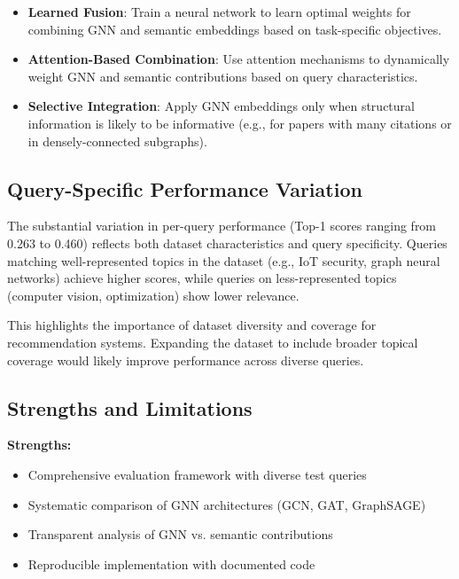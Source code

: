 \documentclass[pdflatex,sn-mathphys-num]{sn-jnl}
\theoremstyle{thmstyleone}%
\theoremstyle{thmstyletwo}%
\theoremstyle{thmstylethree}%
\begin{document}
\begin{itemize}
    \item \textbf{Learned Fusion}: Train a neural network to learn optimal weights for combining GNN and semantic embeddings based on task-specific objectives.

    \item \textbf{Attention-Based Combination}: Use attention mechanisms to dynamically weight GNN and semantic contributions based on query characteristics.

    \item \textbf{Selective Integration}: Apply GNN embeddings only when structural information is likely to be informative (e.g., for papers with many citations or in densely-connected subgraphs).
\end{itemize}

\subsection{Query-Specific Performance Variation}

The substantial variation in per-query performance (Top-1 scores ranging from 0.263 to 0.460) reflects both dataset characteristics and query specificity. Queries matching well-represented topics in the dataset (e.g., IoT security, graph neural networks) achieve higher scores, while queries on less-represented topics (computer vision, optimization) show lower relevance.

This highlights the importance of dataset diversity and coverage for recommendation systems. Expanding the dataset to include broader topical coverage would likely improve performance across diverse queries.

\subsection{Strengths and Limitations}

\textbf{Strengths:}

\begin{itemize}
    \item Comprehensive evaluation framework with diverse test queries
    \item Systematic comparison of GNN architectures (GCN, GAT, GraphSAGE)
    \item Transparent analysis of GNN vs. semantic contributions
    \item Reproducible implementation with documented code
\end{itemize}
\end{document}
